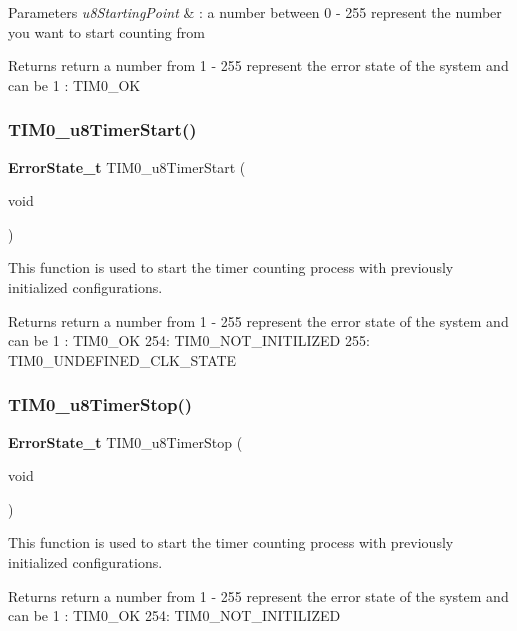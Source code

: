 \begin{DoxyParams}{Parameters}
{\em u8\+Starting\+Point} & \+: a number between 0 -\/ 255 represent the number you want to start counting from \\
\hline
\end{DoxyParams}
\begin{DoxyReturn}{Returns}
return a number from 1 -\/ 255 represent the error state of the system and can be 1 \+: T\+I\+M0\+\_\+\+OK 
\end{DoxyReturn}
\mbox{\label{_t_i_m_e_r0__interface_8h_af55bbe4c18d1c81a9ac0e9d0c1829e86}} 
\subsubsection{T\+I\+M0\+\_\+u8\+Timer\+Start()}
{\footnotesize\ttfamily \textbf{ Error\+State\+\_\+t} T\+I\+M0\+\_\+u8\+Timer\+Start (\begin{DoxyParamCaption}\item[{void}]{ }\end{DoxyParamCaption})}



This function is used to start the timer counting process with previously initialized configurations. 

\begin{DoxyReturn}{Returns}
return a number from 1 -\/ 255 represent the error state of the system and can be 1 \+: T\+I\+M0\+\_\+\+OK 254\+: T\+I\+M0\+\_\+\+N\+O\+T\+\_\+\+I\+N\+I\+T\+I\+L\+I\+Z\+ED 255\+: T\+I\+M0\+\_\+\+U\+N\+D\+E\+F\+I\+N\+E\+D\+\_\+\+C\+L\+K\+\_\+\+S\+T\+A\+TE 
\end{DoxyReturn}
\mbox{\label{_t_i_m_e_r0__interface_8h_a879b492bece4a913fb4a0d0b0e96dcd1}} 
\subsubsection{T\+I\+M0\+\_\+u8\+Timer\+Stop()}
{\footnotesize\ttfamily \textbf{ Error\+State\+\_\+t} T\+I\+M0\+\_\+u8\+Timer\+Stop (\begin{DoxyParamCaption}\item[{void}]{ }\end{DoxyParamCaption})}



This function is used to start the timer counting process with previously initialized configurations. 

\begin{DoxyReturn}{Returns}
return a number from 1 -\/ 255 represent the error state of the system and can be 1 \+: T\+I\+M0\+\_\+\+OK 254\+: T\+I\+M0\+\_\+\+N\+O\+T\+\_\+\+I\+N\+I\+T\+I\+L\+I\+Z\+ED 
\end{DoxyReturn}
